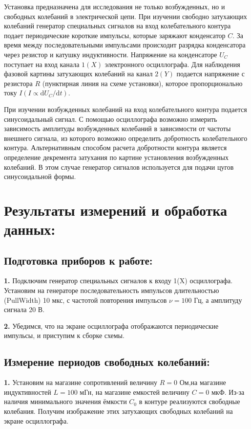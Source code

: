 \documentclass[a4paper, 12pt]{article}
\begin{document}
Установка предназначена для исследования не только возбужденных, но и свободных колебаний в электрической цепи. При изучении свободно затухающих колебаний генератор специальных сигналов на вход колебательного контура подает периодические короткие импульсы, которые заряжают конденсатор $C$. За время между
последовательными импульсами происходит разрядка конденсатора через резистор
и катушку индуктивности. Напряжение на конденсаторе $U_C$ поступает на вход канала $1(X)$ электронного осциллографа. Для наблюдения фазовой картины затухающих
колебаний на канал $2(Y)$ подается напряжение с резистора $R$ (пунктирная линия на схеме установки), которое пропорционально току $I (I \propto \mathrm{d}U_C/\mathrm{d}t)$.

При изучении возбужденных колебаний на вход колебательного контура подается синусоидальный сигнал. С помощью осциллографа возможно измерить зависимость амплитуды возбужденных колебаний в зависимости от частоты внешнего сигнала, из которого возможно определить добротность колебательного контура. Альтернативным способом расчета добротности контура является определение декремента затухания по картине установления возбужденных колебаний. В этом случае генератор сигналов используется для подачи цугов синусоидальной формы.


\section{Результаты измерений и обработка данных:}
\subsection{Подготовка приборов к работе:}
\textbf{1.} Подключим генератор специальных сигналов к входу 1(X) осциллографа. Установим на генераторе последовательность импульсов длительностью (PullWidth) 10 мкс, с частотой повторения импульсов
$\nu = 100$ Гц, а амплитуду сигнала 20 В. 

\textbf{2.} Убедимся, что на экране осциллографа отображаются периодические импульсы, и приступим к сборке схемы.

\subsection{Измерение периодов свободных колебаний:}
\textbf{1.} Установим на магазине сопротивлений величину $R = 0$ Ом,на магазине индуктивностей $L = 100$ мГн, на магазине емкостей величину $C = 0$ мкФ. Из-за наличия минимального значения ёмкости $C_0$ в контуре реализуются свободные колебания. Получим изображение этих затухающих свободных колебаний на экране осциллографа.
\end{document}
